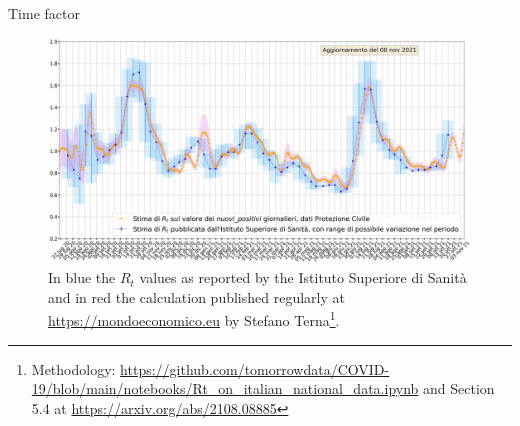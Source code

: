 \documentclass[9pt]{beamer}
\begin{document}
\begin{frame}{Time factor}

\begin{figure}[H]
\center
\includegraphics[scale=0.19]{RtEstimation4.jpg}
\caption{In blue the $R_t$ values as reported by the Istituto Superiore di Sanit\`{a} and in red the calculation published regularly at \url{https://mondoeconomico.eu} by Stefano Terna\footnote{Methodology: \url{https://github.com/tomorrowdata/COVID-19/blob/main/notebooks/Rt_on_italian_national_data.ipynb} and Section 5.4 at \url{https://arxiv.org/abs/2108.08885}}.}
\label{Rt}
\end{figure}


\end{frame}
\end{document}
